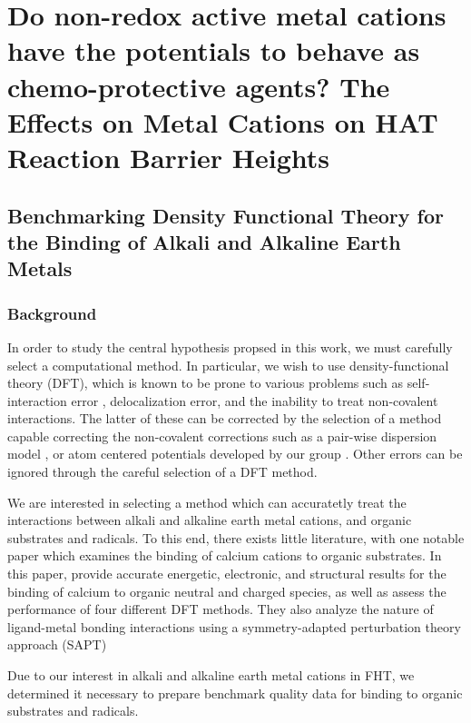 
\chapter{Do non-redox active metal cations have the potentials to behave as chemo-protective agents? The Effects on Metal Cations on HAT Reaction Barrier Heights}
\label{ch:hat}

\section{Benchmarking Density Functional Theory for the Binding of
  Alkali and Alkaline Earth Metals}

\subsection{Background}

In order to study the central hypothesis propsed in this work, we must carefully
select a computational method. In particular, we wish to use density-functional
theory (DFT), which is known to be prone to various problems such as
self-interaction error \cite{Dutoi2006}, delocalization
error,\cite{OterodelaRoza2014} and the inability to treat non-covalent
interactions.\cite{Johnson2009,DiLabio2016} The latter of these can be corrected
by the selection of a method capable correcting the non-covalent corrections
such as a pair-wise dispersion model , or atom
centered potentials developed by our group
. Other errors can be ignored through the
careful selection of a DFT method.

We are interested in selecting a method which can accuratetly treat
the interactions between alkali and alkaline earth metal cations, and
organic substrates and radicals. To this end, there exists little
literature, with one notable paper\cite{Suarez2011} which examines the
binding of calcium cations to organic substrates. In this paper,
\citet{Suarez2011} provide accurate energetic, electronic, and
structural results for the binding of calcium to organic neutral and
charged species, as well as assess the performance of four different
DFT methods. They also analyze the nature of ligand-metal bonding
interactions using a symmetry-adapted perturbation theory approach
(SAPT) 

Due to our interest in alkali and alkaline earth metal cations in FHT,
we determined it necessary to prepare benchmark quality data for
binding to organic substrates and radicals.

